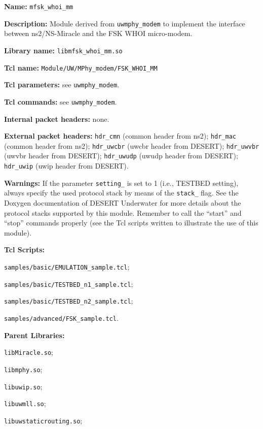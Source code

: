 \begin{description}
   \item {\bf Name:} {\tt mfsk\_whoi\_mm}
   \item {\bf Description:} Module derived from {\tt uwmphy\_modem} to implement the interface between ns2/NS-Miracle and the FSK WHOI micro-modem. 
   \item {\bf Library name:} {\tt libmfsk\_whoi\_mm.so}
   \item {\bf Tcl name:} {\tt Module/UW/MPhy\_modem/FSK\_WHOI\_MM}
   \item {\bf Tcl parameters:} see {\tt uwmphy\_modem}.
   \item {\bf Tcl commands:} see {\tt uwmphy\_modem}.
   \item {\bf Internal packet headers:} none.
   \item {\bf External packet headers:} {\tt hdr\_cmn} (common header from ns2); {\tt hdr\_mac} (common header from ns2); {\tt hdr\_uwcbr} (uwcbr header from DESERT); {\tt hdr\_uwvbr} (uwvbr header from DESERT); {\tt hdr\_uwudp} (uwudp header from DESERT); {\tt hdr\_uwip} (uwip header from DESERT).
   \item {\bf Warnings:} If the parameter {\tt setting\_} is set to 1 (i.e., TESTBED setting), always specify the used protocol stack by means of the {\tt stack\_} flag. See the Doxygen documentation of DESERT Underwater for more details about the protocol stacks supported by this module. Remember to call the ``start'' and ``stop'' commands properly (see the Tcl scripts written to illustrate the use of this module).
   \item {\bf Tcl Scripts:} 
    	\begin{description}
		\item {\tt samples/basic/EMULATION\_sample.tcl};
		\item {\tt samples/basic/TESTBED\_n1\_sample.tcl}; 
		\item {\tt samples/basic/TESTBED\_n2\_sample.tcl};
		\item {\tt samples/advanced/FSK\_sample.tcl}.
	   \end{description}
   \item {\bf Parent Libraries:}
      \begin{description}
		\item {\tt libMiracle.so};
      \item {\tt libmphy.so};
      \item {\tt libuwip.so};
      \item {\tt libuwmll.so};
      \item {\tt libuwstaticrouting.so};

\end{description}
\end{description}
